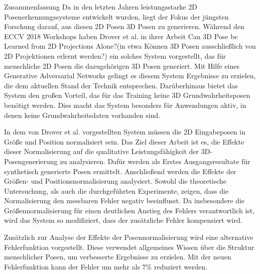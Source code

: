 \pagebreak
{}
\begin{polyabstract}{Zusammenfassung}
	Da in den letzten Jahren leistungsstarke 2D Posenerkennungssysteme entwickelt wurden, liegt der Fokus der jüngsten Forschung darauf, aus diesen 2D Posen 3D Posen zu generieren.
	Während den ECCV 2018 Workshops haben Drover et al. in ihrer Arbeit \glqq Can 3D Pose be Learned from 2D Projections Alone?\grqq (in etwa \glqq Können 3D Posen ausschließlich von 2D Projektionen erlernt werden?\grqq) ein solches System vorgestellt, das für menschliche 2D Posen die dazugehörigen 3D Posen generiert.
	Mit Hilfe eines Generative Adversarial Networks gelingt es diesem System Ergebnisse zu erzielen, die dem aktuellen Stand der Technik entsprechen.
	Darüberhinaus bietet das System den großen Vorteil, das für das Training keine 3D Grundwahrheitsposen benötigt werden.
	Dies macht das System besonders für Anwendungen aktiv, in denen keine Grundwahrheitsdaten vorhanden sind.
	
	In dem von Drover et al. vorgestellten System müssen die 2D Eingabeposen in Größe und Position normalisiert sein.
	Das Ziel dieser Arbeit ist es, die Effekte dieser Normalisierung auf die qualitative Leistungsfähigkeit der 3D-Posengenerierung zu analysieren.
	Dafür werden als Erstes Ausgangsresultate für synthetisch generierte Posen ermittelt.
	Anschließend werden die Effekte der Größen- und Positionsnormalisierung analysiert.
	Sowohl die theoretische Untersuchung, als auch die durchgeführten Experimente, zeigen, dass die Normalisierung den messbaren Fehler negativ beeinflusst.
	Da insbesondere die Größennormalisierung für einen deutlichen Anstieg des Fehlers verantwortlich ist, wird das System so modifiziert, dass der zusätzliche Fehler kompensiert wird.
	
	Zusätzlich zur Analyse der Effekte der Posennormalisierung wird eine alternative Fehlerfunktion vorgestellt.
	Diese verwendet allgemeines Wissen über die Struktur menschlicher Posen, um verbesserte Ergebnisse zu erzielen.
	Mit der neuen Fehlerfunktion kann der Fehler um mehr als $7\%$ reduziert werden. 
\end{polyabstract}

